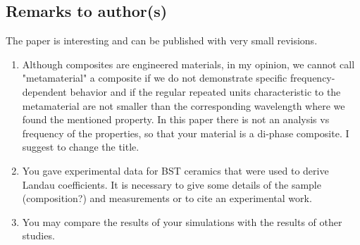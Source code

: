 \documentclass[%
 aip,
 amsmath,amssymb,
 reprint,%
]{revtex4-1}
\begin{document}
\subsection{Remarks to author(s)}

  The paper is interesting and can be published with very small revisions.

  \begin{enumerate}
  \item Although composites are engineered materials, in my opinion, we cannot call "metamaterial" a
   composite if we do not demonstrate specific frequency-dependent behavior and if the regular repeated
    units characteristic to the metamaterial are not smaller than the corresponding wavelength where we
     found the mentioned property. In this paper there is not an analysis vs frequency of the properties,
      so that your material is a di-phase composite. I suggest to change the title.
  \item You gave experimental data for BST ceramics that were used to derive Landau coefficients. It is
   necessary to give some details of the sample (composition?) and measurements or to cite an experimental
    work.
  \item You may compare the results of your simulations with the results of other studies.


\end{enumerate}
\end{document}
